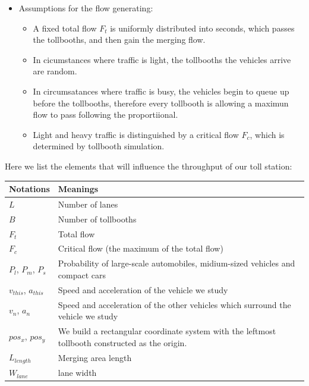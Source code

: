 \documentclass{mcmthesis}
\begin{document}
\begin{itemize}
\begin{itemize}
    \end{itemize}
    \item Assumptions for the flow generating:
    \begin{itemize}
    \item A fixed total flow $F_t$ is uniformly distributed into seconds, which passes the tollbooths, and then gain the merging flow.
   	\item In cicumstances where traffic is light, the tollbooths the vehicles arrive are random.
    \item In circumsatances where traffic is busy, the vehicles begin to queue up before the tollbooths, therefore every tollbooth is allowing a maximun flow to pass following the proportiional.
    \item Light and heavy traffic is distinguished by a critical flow  $F_c$, which is determined by tollbooth simulation.
    \end{itemize}
	
	
\end{itemize}



Here we list the elements that will influence the throughput of our toll station:
\begin{table}[h]
\centering
   \begin{tabular}{|m{7cm}<{\centering}|p{7cm}<{\centering}|}
   	
   	\hline
   	Notations & Meanings \\
   	\hline
   	$L$ &  Number of lanes \\
   	\hline
   	$B$ &  Number of tollbooths\\
   	\hline
   	$F_t$ & 	 Total flow\\
   	\hline
   	$F_c$ & Critical flow (the maximum of the total flow)\\
   	\hline
   	$P_l$,  $P_m$, $P_s$ & Probability of large-scale automobiles, midium-sized vehicles and compact cars\\
   	\hline
   	$v_{this}$, $a_{this}$ & Speed and acceleration of the vehicle we study\\
   	\hline
   	$v_n$, $a_n$ &  Speed and acceleration of the other vehicles which surround the vehicle we study\\
   	\hline
   	$pos_x$, $pos_y$ & We build a rectangular coordinate system  with the leftmost tollbooth constructed as the origin.\\
   	\hline
   	$L_{length}$ & Merging area length \\
   	\hline
   	$W_{lane}$ & lane width \\
   	\hline
   	
   \end{tabular}
\end{table}\\
\end{document}
